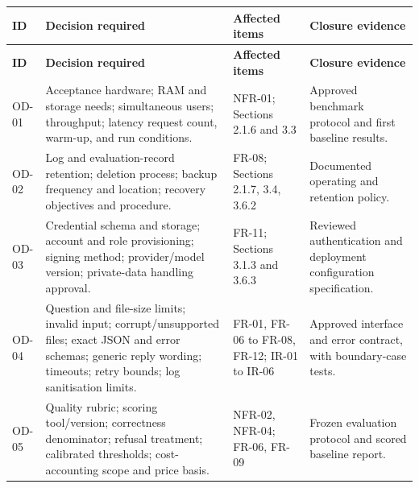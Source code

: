 \documentclass[11pt,letterpaper]{article}
\begin{document}
\begingroup\small

\begin{longtable}{|P{\arrayrulewidth\relax}|P{\arrayrulewidth\relax}|P{\arrayrulewidth\relax}|P{\arrayrulewidth\relax}|}

\hline{}

\textbf{ID} & \textbf{Decision required} & \textbf{Affected items} & \textbf{Closure evidence} \\ \hline

\endfirsthead

\hline{}

\textbf{ID} & \textbf{Decision required} & \textbf{Affected items} & \textbf{Closure evidence} \\ \hline

\endhead

\hline\endfoot

\hline\endlastfoot

OD-01 & Acceptance hardware; RAM and storage needs; simultaneous users; throughput; latency request count, warm-up, and run conditions. & NFR-01; Sections 2.1.6 and 3.3 & Approved benchmark protocol and first baseline results. \\ \hline

OD-02 & Log and evaluation-record retention; deletion process; backup frequency and location; recovery objectives and procedure. & FR-08; Sections 2.1.7, 3.4, 3.6.2 & Documented operating and retention policy. \\ \hline

OD-03 & Credential schema and storage; account and role provisioning; signing method; provider/model version; private-data handling approval. & FR-11; Sections 3.1.3 and 3.6.3 & Reviewed authentication and deployment configuration specification. \\ \hline

OD-04 & Question and file-size limits; invalid input; corrupt/unsupported files; exact JSON and error schemas; generic reply wording; timeouts; retry bounds; log sanitisation limits. & FR-01, FR-06 to FR-08, FR-12; IR-01 to IR-06 & Approved interface and error contract, with boundary-case tests. \\ \hline

OD-05 & Quality rubric; scoring tool/version; correctness denominator; refusal treatment; calibrated thresholds; cost-accounting scope and price basis. & NFR-02, NFR-04; FR-06, FR-09 & Frozen evaluation protocol and scored baseline report. \\ \hline


\end{longtable}
\end{document}
